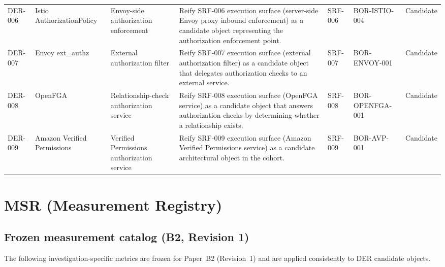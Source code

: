 \documentclass{article}
\begin{document}
\begin{longtable}{@{}p{}p{}p{}p{}p{}p{}p{}@{}}
DER-006 & Istio AuthorizationPolicy & Envoy-side authorization enforcement & Reify SRF-006 execution surface (server-side Envoy proxy inbound enforcement) as a candidate object representing the authorization enforcement point. & SRF-006 & BOR-ISTIO-004 & Candidate\\
DER-007 & Envoy ext\_authz & External authorization filter & Reify SRF-007 execution surface (external authorization filter) as a candidate object that delegates authorization checks to an external service. & SRF-007 & BOR-ENVOY-001 & Candidate\\
DER-008 & OpenFGA & Relationship-check authorization service & Reify SRF-008 execution surface (OpenFGA service) as a candidate object that answers authorization checks by determining whether a relationship exists. & SRF-008 & BOR-OPENFGA-001 & Candidate\\
DER-009 & Amazon Verified Permissions & Verified Permissions authorization service & Reify SRF-009 execution surface (Amazon Verified Permissions service) as a candidate architectural object in the cohort. & SRF-009 & BOR-AVP-001 & Candidate\\
\bottomrule
\end{longtable}

\newpage
\section*{MSR (Measurement Registry)}

\subsection*{Frozen measurement catalog (B2, Revision 1)}

The following investigation-specific metrics are frozen for Paper~B2 (Revision~1) and are applied consistently to DER candidate objects.
\end{document}
